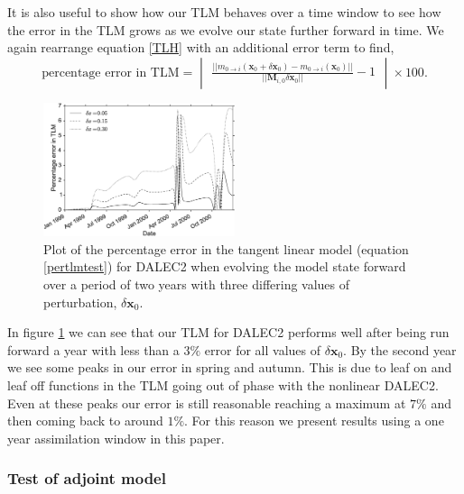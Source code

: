 \documentclass[11pt]{article}
\begin{document}
It is also useful to show how our TLM behaves over a time window to see how the error in the TLM grows as we evolve our state further forward in time. We again rearrange equation \ref{TLH} with an additional error term to find, 
\begin{equation}
\text{percentage error in TLM} = \begin{vmatrix} \frac{||m_{0\rightarrow i}(\mathbf{x}_0+\delta\mathbf{x}_0) - m_{0 \rightarrow i}(\mathbf{x}_0)||}{|| \mathbf{M}_{i,0}\delta\mathbf{x}_0||} - 1 \end{vmatrix} \times 100. \label{pertlmtest}
\end{equation}

\begin{figure}[ht]
    \centering
    \includegraphics[width=0.5\textwidth]{percenterrlinmod.eps}
    \caption{Plot of the percentage error in the tangent linear model (equation \ref{pertlmtest}) for DALEC2 when evolving the model state forward over a period of two years with three differing values of perturbation, $\delta \textbf{x}_0$.}
    \label{fig:tlm_error}
\end{figure}

In figure \ref{fig:tlm_error} we can see that our TLM for DALEC2 performs well after being run forward a year with less than a $3\%$ error for all values of $\delta \textbf{x}_0$. By the second year we see some peaks in our error in spring and autumn. This is due to leaf on and leaf off functions in the TLM going out of phase with the nonlinear DALEC2. Even at these peaks our error is still reasonable reaching a maximum at $7\%$ and then coming back to around $1\%$. For this reason we present results using a one year assimilation window in this paper. 

\subsubsection{Test of adjoint model} 
\end{document}
